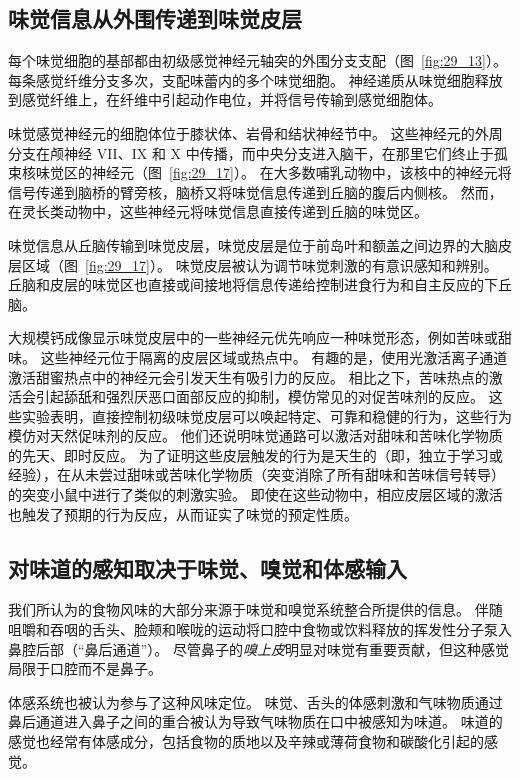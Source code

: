 \subsection{味觉信息从外围传递到味觉皮层}

每个味觉细胞的基部都由初级感觉神经元轴突的外围分支支配（图~\ref{fig:29_13}）。
每条感觉纤维分支多次，支配味蕾内的多个味觉细胞。
神经递质从味觉细胞释放到感觉纤维上，在纤维中引起动作电位，并将信号传输到感觉细胞体。


味觉感觉神经元的细胞体位于膝状体、岩骨和结状神经节中。
这些神经元的外周分支在颅神经 VII、IX 和 X 中传播，而中央分支进入脑干，在那里它们终止于孤束核味觉区的神经元（图~\ref{fig:29_17}）。
在大多数哺乳动物中，该核中的神经元将信号传递到脑桥的臂旁核，脑桥又将味觉信息传递到丘脑的腹后内侧核。 
然而，在灵长类动物中，这些神经元将味觉信息直接传递到丘脑的味觉区。


味觉信息从丘脑传输到味觉皮层，味觉皮层是位于前岛叶和额盖之间边界的大脑皮层区域（图~\ref{fig:29_17}）。
味觉皮层被认为调节味觉刺激的有意识感知和辨别。
丘脑和皮层的味觉区也直接或间接地将信息传递给控制进食行为和自主反应的下丘脑。


大规模钙成像显示味觉皮层中的一些神经元优先响应一种味觉形态，例如苦味或甜味。
这些神经元位于隔离的皮层区域或热点中。
有趣的是，使用光激活离子通道激活甜蜜热点中的神经元会引发天生有吸引力的反应。
相比之下，苦味热点的激活会引起舔舐和强烈厌恶口面部反应的抑制，模仿常见的对促苦味剂的反应。
这些实验表明，直接控制初级味觉皮层可以唤起特定、可靠和稳健的行为，这些行为模仿对天然促味剂的反应。
他们还说明味觉通路可以激活对甜味和苦味化学物质的先天、即时反应。
为了证明这些皮层触发的行为是天生的（即，独立于学习或经验），在从未尝过甜味或苦味化学物质（突变消除了所有甜味和苦味信号转导）的突变小鼠中进行了类似的刺激实验。
即使在这些动物中，相应皮层区域的激活也触发了预期的行为反应，从而证实了味觉的预定性质。



\subsection{对味道的感知取决于味觉、嗅觉和体感输入}

我们所认为的食物风味的大部分来源于味觉和嗅觉系统整合所提供的信息。
伴随咀嚼和吞咽的舌头、脸颊和喉咙的运动将口腔中食物或饮料释放的挥发性分子泵入鼻腔后部（“鼻后通道”）。 
尽管鼻子的\textit{嗅上皮}明显对味觉有重要贡献，但这种感觉局限于口腔而不是鼻子。


体感系统也被认为参与了这种风味定位。
味觉、舌头的体感刺激和气味物质通过鼻后通道进入鼻子之间的重合被认为导致气味物质在口中被感知为味道。
味道的感觉也经常有体感成分，包括食物的质地以及辛辣或薄荷食物和碳酸化引起的感觉。



